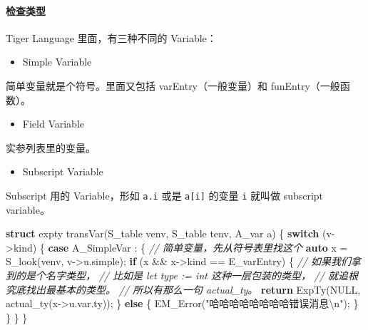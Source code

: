 \documentclass[
]{article}
\newenvironment{Shaded}{}{}
\newcommand{\CommentTok}[1]{\textcolor[rgb]{0.38,0.63,0.69}{\textit{#1}}}
\newcommand{\ControlFlowTok}[1]{\textcolor[rgb]{0.00,0.44,0.13}{\textbf{#1}}}
\newcommand{\KeywordTok}[1]{\textcolor[rgb]{0.00,0.44,0.13}{\textbf{#1}}}
\newcommand{\NormalTok}[1]{#1}
\newcommand{\SpecialCharTok}[1]{\textcolor[rgb]{0.25,0.44,0.63}{#1}}
\newcommand{\StringTok}[1]{\textcolor[rgb]{0.25,0.44,0.63}{#1}}
\begin{document}
\hypertarget{header-n41}{%
\paragraph{检查类型}\label{header-n41}}

Tiger Language 里面，有三种不同的 Variable：

\begin{itemize}
\item
  Simple Variable
\end{itemize}

简单变量就是个符号。里面又包括 varEntry（一般变量）和
funEntry（一般函数）。

\begin{itemize}
\item
  Field Variable
\end{itemize}

实参列表里的变量。

\begin{itemize}
\item
  Subscript Variable
\end{itemize}

Subscript 用的 Variable，形如 \texttt{a.i} 或是 \texttt{a{[}i{]}} 的变量
\texttt{i} 就叫做 subscript variable。

\begin{Shaded}
\begin{Highlighting}[]
\KeywordTok{struct}\NormalTok{ expty transVar(S_table venv, S_table tenv, A_var a) \{}
    \ControlFlowTok{switch}\NormalTok{ (v->kind) \{}
        \ControlFlowTok{case}\NormalTok{ A_SimpleVar : \{}
            \CommentTok{// 简单变量，先从符号表里找这个}
            \KeywordTok{auto}\NormalTok{ x = S_look(venv, v->u.simple);}
            \ControlFlowTok{if}\NormalTok{ (x && x->kind == E_varEntry) \{}
                \CommentTok{// 如果我们拿到的是个名字类型，}
                \CommentTok{// 比如是 let type := int 这种一层包装的类型，}
                \CommentTok{// 就追根究底找出最基本的类型。}
                \CommentTok{// 所以有那么一句 actual_ty。}
                \ControlFlowTok{return}\NormalTok{ ExpTy(NULL, actual_ty(x->u.var.ty));}
\NormalTok{            \} }\ControlFlowTok{else}\NormalTok{ \{}
\NormalTok{                EM_Error(}\StringTok{"哈哈哈哈哈哈哈哈错误消息}\SpecialCharTok{\textbackslash{}n}\StringTok{"}\NormalTok{);}
\NormalTok{            \}}
\NormalTok{        \}}
\NormalTok{    \}}
\NormalTok{\}}
\end{Highlighting}
\end{Shaded}
\end{document}
